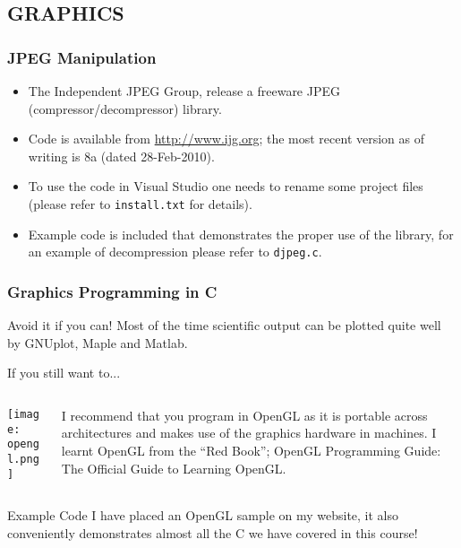 \documentclass[smaller,table]{beamer} %
\begin{document}
\subsection{GRAPHICS}
\begin{frame}
\frametitle{JPEG Manipulation}
\begin{itemize}
\item The Independent JPEG Group, release a freeware JPEG (compressor/decompressor) library.
\item Code is available from \url{http://www.ijg.org}; the most recent version as of writing is 8a (dated 28-Feb-2010).
\item To use the code in Visual Studio one needs to rename some project files (please refer to {\tt install.txt} for details).
\item Example code is included that demonstrates the proper use of the library, for an example of decompression please refer to {\tt djpeg.c}.
\end{itemize}


\end{frame}

\begin{frame}
\frametitle{Graphics Programming in C}
\begin{alertblock}{Avoid it if you can!}
Most of the time scientific output can be plotted quite well by GNUplot, Maple and Matlab.
\end{alertblock}
\begin{block}{If you still want to...}
\begin{columns}
\begin{column}{1.7cm}
\texttt{[image: opengl.png]}
\end{column}
\begin{column}{8cm}
I recommend that you program in OpenGL as it is portable across architectures and makes use of the graphics hardware in machines. I learnt OpenGL from the ``Red Book''; OpenGL Programming Guide: The Official Guide to Learning OpenGL.
\end{column}
\end{columns}
\end{block}
\begin{exampleblock}{Example Code}
I have placed an OpenGL sample on my website, it also conveniently demonstrates almost all the C we have covered in this course!
\end{exampleblock}
\end{frame}
\end{document}
